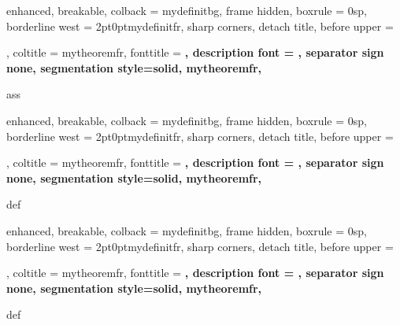{%
	enhanced,
	breakable,
	colback = mydefinitbg,
	frame hidden,
	boxrule = 0sp,
	borderline west = {2pt}{0pt}{mydefinitfr},
	sharp corners,
	detach title,
	before upper = \tcbtitle\par\smallskip,
	coltitle = mytheoremfr,
	fonttitle = \bfseries\sffamily,
	description font = \mdseries,
	separator sign none,
	segmentation style={solid, mytheoremfr},
}
{ass}


{%
	enhanced,
	breakable,
	colback = mydefinitbg,
	frame hidden,
	boxrule = 0sp,
	borderline west = {2pt}{0pt}{mydefinitfr},
	sharp corners,
	detach title,
	before upper = \tcbtitle\par\smallskip,
	coltitle = mytheoremfr,
	fonttitle = \bfseries\sffamily,
	description font = \mdseries,
	separator sign none,
	segmentation style={solid, mytheoremfr},
}
{def}

{%
	enhanced,
	breakable,
	colback = mydefinitbg,
	frame hidden,
	boxrule = 0sp,
	borderline west = {2pt}{0pt}{mydefinitfr},
	sharp corners,
	detach title,
	before upper = \tcbtitle\par\smallskip,
	coltitle = mytheoremfr,
	fonttitle = \bfseries\sffamily,
	description font = \mdseries,
	separator sign none,
	segmentation style={solid, mytheoremfr},
}
{def}






